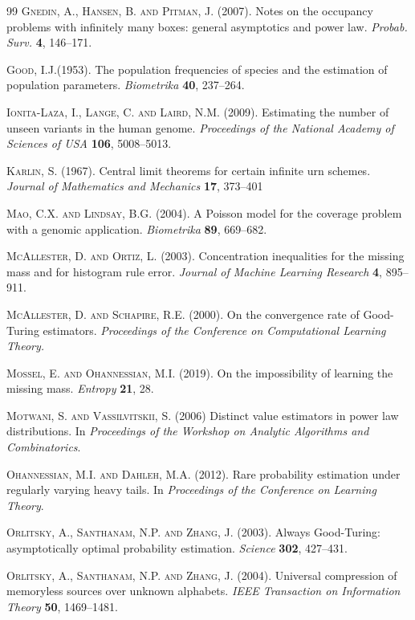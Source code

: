 \documentclass{article}
\newcommand{\1}{\boldsymbol{1}}
\theoremstyle{plain}
\begin{document}
\begin{thebibliography}{99}
\textsc{Gnedin, A., Hansen, B. and Pitman, J.} (2007). Notes on the occupancy problems with infinitely many boxes: general asymptotics and power law. \textit{Probab. Surv.} \textbf{4}, 146--171.

\textsc{Good, I.J.}(1953). The population frequencies of species and the estimation of population parameters. \textit{Biometrika} \textbf{40}, 237--264.


\textsc{Ionita-Laza, I., Lange, C. and Laird, N.M.} (2009). Estimating the number of unseen variants in the human genome. \textit{Proceedings of the National Academy of Sciences of USA} \textbf{106}, 5008--5013.

\textsc{Karlin, S.} (1967). Central limit theorems for certain infinite urn schemes. \textit{Journal of Mathematics and Mechanics} \textbf{17}, 373--401

\textsc{Mao, C.X. and Lindsay, B.G.} (2004). A Poisson model for the coverage problem with a genomic application. \textit{Biometrika} \textbf{89}, 669--682.

\textsc{McAllester, D. and Ortiz, L.} (2003). Concentration inequalities for the missing mass and for histogram rule error. \textit{Journal of Machine Learning Research} \textbf{4}, 895--911.

\textsc{McAllester, D. and Schapire, R.E.} (2000). On the convergence rate of Good-Turing estimators. \textit{Proceedings of the Conference on Computational Learning Theory.}

\textsc{Mossel, E. and  Ohannessian, M.I.} (2019). On the impossibility of learning the missing mass. \textit{Entropy} \textbf{21}, 28.

\textsc{Motwani, S. and Vassilvitskii, S.} (2006) Distinct value estimators in power law distributions. In \textit{Proceedings of the Workshop on Analytic Algorithms and Combinatorics}.

\textsc{Ohannessian, M.I. and Dahleh, M.A.} (2012). Rare probability estimation under regularly varying heavy tails. In \textit{Proceedings of the Conference on Learning Theory}.

\textsc{Orlitsky, A., Santhanam, N.P. and Zhang, J.} (2003). Always Good-Turing: asymptotically optimal probability estimation. \textit{Science} \textbf{302}, 427--431.

\textsc{Orlitsky, A., Santhanam, N.P. and Zhang, J.} (2004). 
Universal compression of memoryless sources over unknown alphabets. \textit{IEEE Transaction on Information Theory} \textbf{50}, 1469--1481.


\end{thebibliography}
\end{document}
